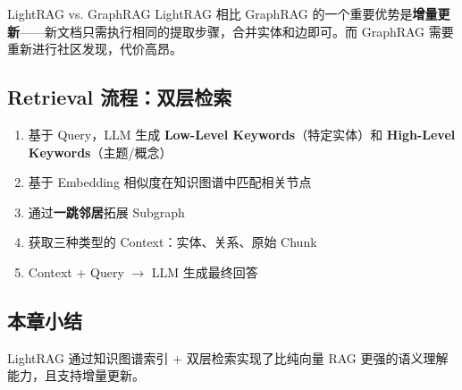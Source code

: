 \begin{knowledgebox}{LightRAG vs. GraphRAG}
LightRAG 相比 GraphRAG 的一个重要优势是\textbf{增量更新}——新文档只需执行相同的提取步骤，合并实体和边即可。而 GraphRAG 需要重新进行社区发现，代价高昂。
\end{knowledgebox}

\subsection{Retrieval 流程：双层检索}

\begin{enumerate}
    \item 基于 Query，LLM 生成 \textbf{Low-Level Keywords}（特定实体）和 \textbf{High-Level Keywords}（主题/概念）
    \item 基于 Embedding 相似度在知识图谱中匹配相关节点
    \item 通过\textbf{一跳邻居}拓展 Subgraph
    \item 获取三种类型的 Context：实体、关系、原始 Chunk
    \item Context + Query $\rightarrow$ LLM 生成最终回答
\end{enumerate}

\subsection{本章小结}

LightRAG 通过知识图谱索引 + 双层检索实现了比纯向量 RAG 更强的语义理解能力，且支持增量更新。

